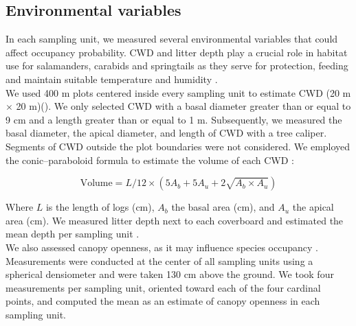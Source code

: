   \vspace{0.5cm}


\subsection*{Environmental variables}
\label{subsec:EnvVar}

In each sampling unit, we measured several environmental variables that could affect occupancy probability.
CWD and litter depth play a crucial role in habitat use for salamanders, carabids and springtails as
they serve for protection, feeding and maintain suitable temperature and humidity \citep{birdChangesSoilLitter2004,groverInfluenceCoverMoisture1998a,harmonEcologyCoarseWoody1986,koivula.LeafLitterSmallscale1999,mckennyEffectsStructuralComplexity2006,patrickEffectsExperimentalForestry2006a}. \\
We used 400 m plots centered inside every sampling unit to estimate CWD (20 m $\times$  20 m)(\citealp{methotGuideInventaireEchantillonnage2014}). 
We only selected CWD with a basal diameter greater than or equal to 9 cm and a length greater than or equal to 1 m.
Subsequently, we measured the basal diameter, the apical diameter, and length of CWD with a tree caliper.
Segments of CWD outside the plot boundaries were not considered.
We employed the conic–paraboloid formula to estimate the volume of each CWD \citep{fraverRefiningVolumeEstimates2007} :

\begin{equation}
  \text{Volume} = L/12 \times (5A_b + 5A_u + 2\sqrt{A_b \times A_u})
\end{equation}

\vspace{0.5cm}

Where $L$ is the length of logs (cm), $A_b$ the basal area (cm), and $A_u$ the apical area (cm).
We measured litter depth next to each coverboard and estimated the mean depth per sampling unit \citep{mazerolleWoodlandSalamanderPopulation2021a}. \\
We also assessed canopy openness, as it may influence species occupancy \citep{henneronForestPlantCommunity2017,koivulaBorealCarabidbeetleColeoptera2002a,kotzeFortyYearsCarabid2011a,messereForestFloorDistribution1998,tilghmanMetaanalysisEffectsCanopy2012}.
Measurements were conducted at the center of all sampling units using a spherical densiometer \citep{lemmonSphericalDensiometerEstimating1956} and were taken 130 cm above the ground. 
We took four measurements per sampling unit, oriented toward each of the four cardinal points, and computed the mean as an estimate of canopy openness in each sampling unit.

